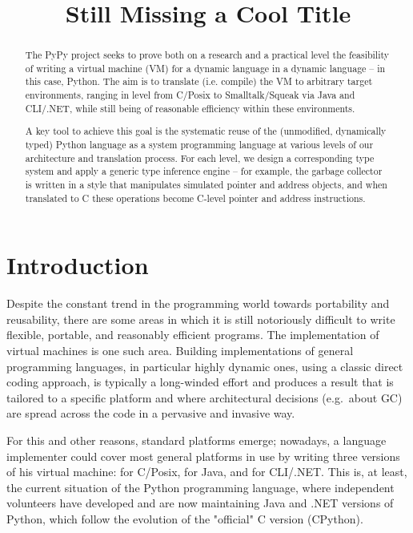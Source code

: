\documentclass{acm_proc_article-sp}
\begin{document}
\title{Still Missing a Cool Title}


\maketitle

\begin{abstract}
The PyPy project seeks to prove both on a research and a
practical level the feasibility of writing a virtual machine (VM)
for a dynamic language in a dynamic language -- in this case, Python.
The aim is to translate (i.e. compile) the VM to arbitrary target
environments, ranging in level from C/Posix to Smalltalk/Squeak via
Java and CLI/.NET, while still being of reasonable efficiency within
these environments.

A key tool to achieve this goal is the systematic reuse of the
(unmodified, dynamically typed) Python language as a system
programming language at various levels of our architecture and
translation process.  For each level, we design a corresponding type
system and apply a generic type inference engine -- for example, the
garbage collector is written in a style that manipulates
simulated pointer and address objects, and when translated to C
these operations become C-level pointer and address instructions.
\end{abstract}

\section{Introduction}

Despite the constant trend in the programming world towards
portability and reusability, there are some areas in which it is still
notoriously difficult to write flexible, portable, and reasonably
efficient programs.  The implementation of virtual machines is one
such area.  Building implementations of general programming languages,
in particular highly dynamic ones, using a classic direct coding
approach, is typically a long-winded effort and produces a result that
is tailored to a specific
platform and where architectural decisions (e.g.\ about GC) are spread
across the code in a pervasive and invasive way.

For this and other reasons, standard platforms emerge; nowadays, a
language implementer could cover most general platforms in use by
writing three versions of his virtual machine: for C/Posix, for Java,
and for CLI/.NET.  This is, at least, the current situation of the
Python programming language, where independent volunteers have
developed and are now maintaining Java and .NET versions of Python,
which follow the evolution of the "official" C version (CPython).
\end{document}
